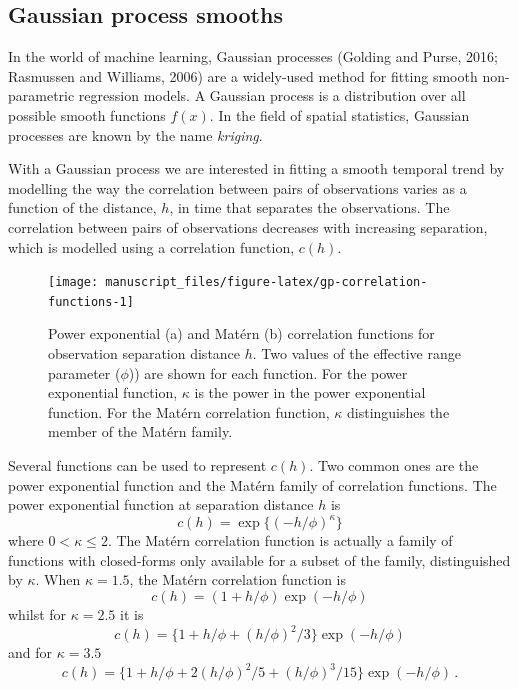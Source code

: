 \documentclass[12pt,]{article}
\begin{document}
\subsection{Gaussian process smooths}\label{gaussian-process-smooths}

In the world of machine learning, Gaussian processes (Golding and Purse,
2016; Rasmussen and Williams, 2006) are a widely-used method for fitting
smooth non-parametric regression models. A Gaussian process is a
distribution over all possible smooth functions \(f(x)\). In the field
of spatial statistics, Gaussian processes are known by the name
\emph{kriging}.

With a Gaussian process we are interested in fitting a smooth temporal
trend by modelling the way the correlation between pairs of observations
varies as a function of the distance, \(h\), in time that separates the
observations. The correlation between pairs of observations decreases
with increasing separation, which is modelled using a correlation
function, \(c(h)\).

\begin{figure}

{\centering \texttt{[image: manuscript\_files/figure-latex/gp-correlation-functions-1]} 

}

\caption{Power exponential (a) and Matérn (b) correlation functions for observation separation distance $h$. Two values of the effective range parameter ($\phi$)) are shown for each function. For the power exponential function, $\kappa$ is the power in the power exponential function. For the Matérn correlation function, $\kappa$ distinguishes the member of the Matérn family.}\label{fig:gp-correlation-functions}
\end{figure}

Several functions can be used to represent \(c(h)\). Two common ones are
the power exponential function and the Matérn family of correlation
functions. The power exponential function at separation distance \(h\)
is \[c(h) = \exp\{(-h/\phi)^{\kappa}\}\] where \(0 < \kappa \leq 2\).
The Matérn correlation function is actually a family of functions with
closed-forms only available for a subset of the family, distinguished by
\(\kappa\). When \(\kappa = 1.5\), the Matérn correlation function is
\[c(h) = (1 + h/\phi) \exp(-h/\phi)\] whilst for \(\kappa = 2.5\) it is
\[c(h) = \{1 + h/\phi + (h/\phi)^2/3\} \exp(-h/\phi)\] and for
\(\kappa = 3.5\)
\[c(h) = \{1 + h/\phi + 2(h/\phi)^2/5 + (h/\phi)^3/15\} \exp(-h/\phi)\, .\]
\end{document}
